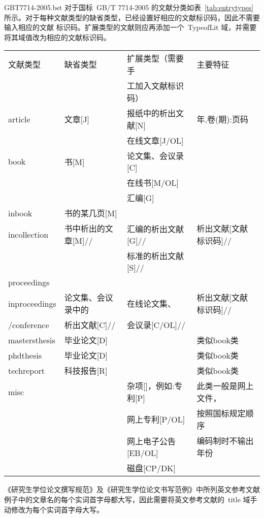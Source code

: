 GBT7714-2005.bst 对于国标~GB/T 7714-2005 的文献分类如表~\ref{tab:entrytypes} 所示。对于每种文献类型的缺省类型，已经设置好相应的文献标识码，因此不需要输入相应的文献
标识码。扩展类型的文献则应再添加一个~TypeofLit 域，并需要将其域值改为相应的文献标识码。
\begin{table}[htbp]
\vspace{0.5em}\centering\wuhao
\begin{tabular}{llll}
\toprule[1.5pt]
文献类型 & 缺省类型 & 扩展类型（需要手 & 主要特征\\
 &  & 工加入文献标识码） & \\
\midrule[1pt]
article & 文章[J] & 报纸中的析出文献[N] & 年,卷(期):页码\\
 &  & 在线文章[J/OL] & \\
book & 书[M] & 论文集、会议录[C] & \\
 &  & 在线书[M/OL] & \\
 &  & 汇编[G] & \\
inbook & 书的某几页[M] &  & \\
incollection & 书中析出的文章[M]// & 汇编的析出文献[G]// & 析出文献[文献标识码]//\\
 &  & 标准的析出文献[S]// & \\
proceedings &  &  & \\
inproceedings & 论文集、会议录中的 & 在线论文集、 & 析出文献[文献标识码]//\\
/conference & 析出文献[C]// & 会议录[C/OL]// & \\
mastersthesis & 毕业论文[D] &  & 类似book类\\
phdthesis & 毕业论文[D] &  & 类似book类\\
techreport & 科技报告[R] &  & 类似book类\\
misc &  & 杂项[]，例如:专利[P] & 此类一般是网上文件，\\
 &  & 网上专利[P/OL] & 按照国标规定顺序\\
 &  & 网上电子公告[EB/OL] & 编码制时不输出年份\\
 &  & 磁盘[CP/DK] & \\
\bottomrule[1.5pt]
\end{tabular}
\end{table}

《研究生学位论文撰写规范》及《研究生学位论文书写范例》中所列英文参考文献例子中的文章名的每个实词首字母都大写，因此需要将英文参考文献的~title 域手动修改为每个实词首字母大写。

